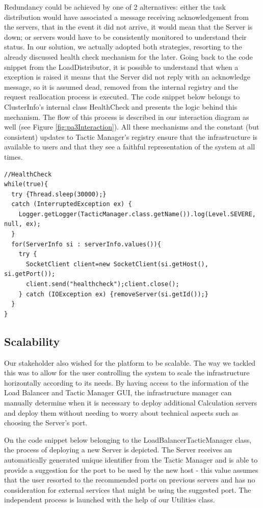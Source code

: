 \documentclass[12pt]{article}
\begin{document}
Redundancy could be achieved by one of 2 alternatives: 
either the task distribution would have associated a message receiving acknowledgement from the servers, that in the event it did not arrive, it would mean that 
the Server is down;
or servers would have to be consistently monitored to understand their status.
In our solution, we actually adopted both strategies, resorting to the already discussed health check mechanism for the later.
Going back to the code snippet from the LoadDistributor, it is possible to understand that when a exception is raised it means that the Server did not reply
with an acknowledge message, so it is assumed dead, removed from the internal registry and the request reallocation process is executed.
The code snippet below belongs to ClusterInfo's internal class HealthCheck and presents the logic behind this mechanism.
The flow of this process is described in our interaction diagram as well (see Figure \ref{fig:pa3Interaction}).
All these mechanisms and the constant (but consistent) updates to Tactic Manager's registry ensure that the infrastructure is available to users and that they 
see a faithful representation of the system at all times.

\begin{lstlisting}
//HealthCheck
while(true){
  try {Thread.sleep(30000);}
  catch (InterruptedException ex) {
    Logger.getLogger(TacticManager.class.getName()).log(Level.SEVERE, null, ex);
  }
  for(ServerInfo si : serverInfo.values()){
    try {
      SocketClient client=new SocketClient(si.getHost(), si.getPort());
      client.send("healthcheck");client.close();
    } catch (IOException ex) {removeServer(si.getId());}
  }
}
\end{lstlisting}

\subsection{Scalability} \label{scalability}

Our stakeholder also wished for the platform to be scalable.
The way we tackled this was to allow for the user controlling the system to scale the infrastructure horizontally according to its needs.
By having access to the information of the Load Balancer and Tactic Manager GUI, the infrastructure manager can manually determine when it is necessary to deploy
additional Calculation servers and deploy them without needing to worry about technical aspects such as choosing the Server's port.

On the code snippet below belonging to the LoadBalancerTacticManager class, the process of deploying a new Server is depicted.
The Server receives an automatically generated unique identifier from the Tactic Manager and is able to provide a suggestion for the port to be used by the new 
host - this value assumes that the user resorted to the recommended ports on previous servers and has no consideration for external services that might be using 
the suggested port.
The independent process is launched with the help of our Utilities class.
\end{document}
